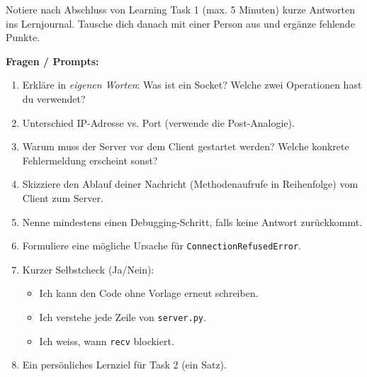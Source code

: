 \begin{myexercise}
Notiere nach Abschluss von Learning Task 1 (max. 5 Minuten) kurze Antworten ins Lernjournal. Tausche dich danach mit einer Person aus und ergänze fehlende Punkte.

\textbf{Fragen / Prompts:}
\begin{enumerate}
    \item Erkläre in \emph{eigenen Worten}: Was ist ein Socket? Welche zwei Operationen hast du verwendet?
    \item Unterschied IP-Adresse vs. Port (verwende die Post-Analogie).
    \item Warum muss der Server vor dem Client gestartet werden? Welche konkrete Fehlermeldung erscheint sonst?
    \item Skizziere den Ablauf deiner Nachricht (Methodenaufrufe in Reihenfolge) vom Client zum Server.
    \item Nenne mindestens einen Debugging-Schritt, falls keine Antwort zurückkommt.
    \item Formuliere eine mögliche Ursache für \texttt{ConnectionRefusedError}.
    \item Kurzer Selbstcheck (Ja/Nein): 
        \begin{itemize}
            \item Ich kann den Code ohne Vorlage erneut schreiben.
            \item Ich verstehe jede Zeile von \texttt{server.py}.
            \item Ich weiss, wann \texttt{recv} blockiert.
        \end{itemize}
    \item Ein persönliches Lernziel für Task 2 (ein Satz).
\end{enumerate}


\end{myexercise}
